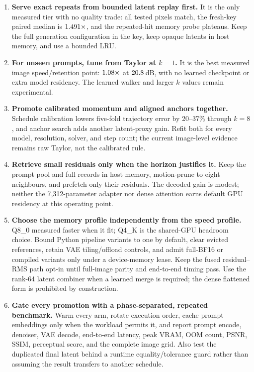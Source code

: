 \documentclass[11pt,a4paper]{article}
\begin{document}
\begin{enumerate}
  \item \textbf{Serve exact repeats from bounded latent replay first.} It is
    the only measured tier with no quality trade: all tested pixels match, the
    fresh-key paired median is $1.491\times$, and the repeated-hit
    memory probe plateaus. Keep the full generation configuration in the key,
    keep opaque latents in host memory, and use a bounded LRU.
  \item \textbf{For unseen prompts, tune from Taylor at $k=1$.} It is the best
    measured image speed/retention point: $1.08\times$ at
    $20.8$\,dB, with no learned checkpoint or extra model residency.
    The learned walker and larger $k$ values remain experimental.
  \item \textbf{Promote calibrated momentum and aligned anchors together.}
    Schedule calibration lowers five-fold trajectory error by 20--37\% through
    $k=8$, and anchor search adds another latent-proxy gain. Refit both for
    every model, resolution, solver, and step count; the current image-level
    evidence remains raw Taylor, not the calibrated rule.
  \item \textbf{Retrieve small residuals only when the horizon justifies it.}
    Keep the prompt pool and full records in host memory, motion-prune to eight
    neighbours, and prefetch only their residuals. The decoded gain is modest;
    neither the 7,312-parameter adapter nor dense attention earns default GPU
    residency at this operating point.
  \item \textbf{Choose the memory profile independently from the speed
    profile.} Q8\_0 measured faster when it fit; Q4\_K is the shared-GPU
    headroom choice. Bound Python pipeline variants to one by default, clear
    evicted references, retain VAE tiling/offload controls, and admit full-BF16
    or compiled variants only under a device-memory lease. Keep the fused
    residual--RMS path opt-in until full-image parity and end-to-end timing pass.
    Use the rank-64 latent combiner when a learned merge is required; the dense
    flattened form is prohibited by construction.
  \item \textbf{Gate every promotion with a phase-separated, repeated
    benchmark.} Warm every arm, rotate execution order, cache prompt embeddings
    only when the workload permits it, and report prompt encode, denoiser, VAE
    decode, end-to-end latency, peak VRAM, OOM count, PSNR, SSIM, perceptual
    score, and the complete image grid. Also test the duplicated final latent
    behind a runtime equality/tolerance guard rather than assuming the result
    transfers to another schedule.
\end{enumerate}
\end{document}
